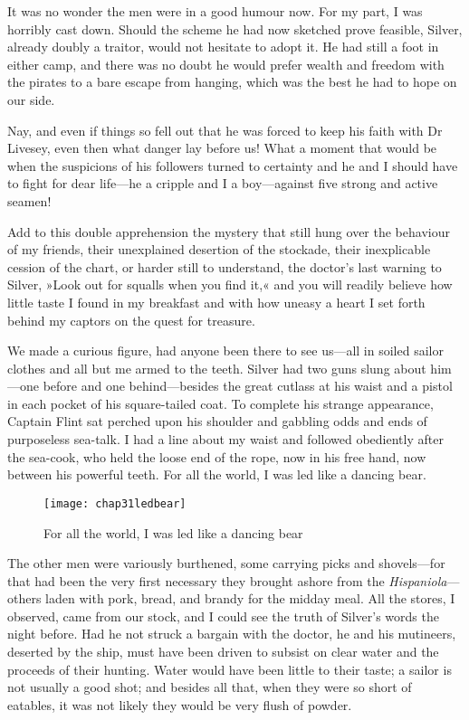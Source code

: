It was no wonder the men were in a good humour now. For my part, I was horribly cast down. Should the scheme he had now sketched prove feasible, Silver, already doubly a traitor, would not hesitate to adopt it. He had still a foot in either camp, and there was no doubt he would prefer wealth and freedom with the pirates to a bare escape from hanging, which was the best he had to hope on our side.

Nay, and even if things so fell out that he was forced to keep his faith with Dr Livesey, even then what danger lay before us! What a moment that would be when the suspicions of his followers turned to certainty and he and I should have to fight for dear life—he a cripple and I a boy—against five strong and active seamen!

Add to this double apprehension the mystery that still hung over the behaviour of my friends, their unexplained desertion of the stockade, their inexplicable cession of the chart, or harder still to understand, the doctor's last warning to Silver, »Look out for squalls when you find it,« and you will readily believe how little taste I found in my breakfast and with how uneasy a heart I set forth behind my captors on the quest for treasure.

We made a curious figure, had anyone been there to see us—all in soiled sailor clothes and all but me armed to the teeth. Silver had two guns slung about him—one before and one behind—besides the great cutlass at his waist and a pistol in each pocket of his square-tailed coat. To complete his strange appearance, Captain Flint sat perched upon his shoulder and gabbling odds and ends of purposeless sea-talk. I had a line about my waist and followed obediently after the sea-cook, who held the loose end of the rope, now in his free hand, now between his powerful teeth. For all the world, I was led like a dancing bear.

\begin{sidewaysfigure}
\texttt{[image: chap31ledbear]}%
\caption{For all the world, I was led like a dancing bear}
\end{sidewaysfigure} 

The other men were variously burthened, some carrying picks and shovels—for that had been the very first necessary they brought ashore from the \textit{Hispaniola}—others laden with pork, bread, and brandy for the midday meal. All the stores, I observed, came from our stock, and I could see the truth of Silver's words the night before. Had he not struck a bargain with the doctor, he and his mutineers, deserted by the ship, must have been driven to subsist on clear water and the proceeds of their hunting. Water would have been little to their taste; a sailor is not usually a good shot; and besides all that, when they were so short of eatables, it was not likely they would be very flush of powder.

